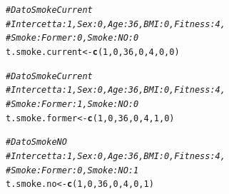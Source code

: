 \documentclass{article}\usepackage[]{graphicx}\usepackage[]{xcolor}
\makeatletter
\newcommand{\hlnum}[1]{\textcolor[rgb]{0.686,0.059,0.569}{#1}}%
\newcommand{\hlcom}[1]{\textcolor[rgb]{0.678,0.584,0.686}{\textit{#1}}}%
\newcommand{\hlstd}[1]{\textcolor[rgb]{0.345,0.345,0.345}{#1}}%
\newcommand{\hlkwb}[1]{\textcolor[rgb]{0.69,0.353,0.396}{#1}}%
\newcommand{\hlkwd}[1]{\textcolor[rgb]{0.737,0.353,0.396}{\textbf{#1}}}%
\newenvironment{kframe}{%
 \def\at@end@of@kframe{}%
 \ifinner\ifhmode%
  \def\at@end@of@kframe{\end{minipage}}%
  \begin{minipage}{\columnwidth}%
 \fi\fi%
 \def\FrameCommand##1{\hskip\@totalleftmargin \hskip-\fboxsep
 \colorbox{shadecolor}{##1}\hskip-\fboxsep
     \hskip-\linewidth \hskip-\@totalleftmargin \hskip\columnwidth}%
 \MakeFramed {\advance\hsize-\width
   \@totalleftmargin\z@ \linewidth\hsize
   \@setminipage}}%
 {\par\unskip\endMakeFramed%
 \at@end@of@kframe}
\newenvironment{knitrout}{}{} %
\makeatother
\begin{document}
\begin{knitrout}
\color{fgcolor}\begin{kframe}
\begin{alltt}
\hlcom{#Dato SmokeCurrent}
\hlcom{#Intercetta: 1, Sex:0, Age: 36, BMI: 0, Fitness: 4, }
\hlcom{#Smoke:Former: 0, Smoke:NO: 0 }
\hlstd{t.smoke.current} \hlkwb{<-} \hlkwd{c}\hlstd{(}\hlnum{1}\hlstd{,} \hlnum{0}\hlstd{,} \hlnum{36}\hlstd{,} \hlnum{0}\hlstd{,} \hlnum{4}\hlstd{,} \hlnum{0}\hlstd{,} \hlnum{0}\hlstd{)}

\hlcom{#Dato SmokeCurrent}
\hlcom{#Intercetta: 1, Sex:0, Age: 36, BMI: 0, Fitness: 4, }
\hlcom{#Smoke:Former: 1, Smoke:NO: 0 }
\hlstd{t.smoke.former} \hlkwb{<-} \hlkwd{c}\hlstd{(}\hlnum{1}\hlstd{,} \hlnum{0}\hlstd{,} \hlnum{36}\hlstd{,} \hlnum{0}\hlstd{,} \hlnum{4}\hlstd{,} \hlnum{1}\hlstd{,} \hlnum{0}\hlstd{)}

\hlcom{#Dato SmokeNO}
\hlcom{#Intercetta: 1, Sex:0, Age: 36, BMI: 0, Fitness: 4, }
\hlcom{#Smoke:Former: 0, Smoke:NO: 1 }
\hlstd{t.smoke.no} \hlkwb{<-} \hlkwd{c}\hlstd{(}\hlnum{1}\hlstd{,} \hlnum{0}\hlstd{,} \hlnum{36}\hlstd{,} \hlnum{0}\hlstd{,} \hlnum{4}\hlstd{,} \hlnum{0}\hlstd{,} \hlnum{1}\hlstd{)}
\end{alltt}
\end{kframe}
\end{knitrout}
    
\end{document}
